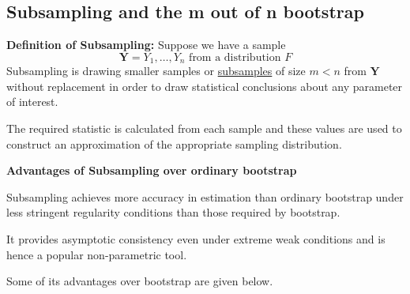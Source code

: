 \documentclass[11pt]{article}
\begin{document}
\subsection{Subsampling and the m out of n bootstrap}
\label{sec-1-5}

\textbf{Definition of Subsampling:} Suppose we have a sample 
$$\mathbf{Y} = Y_1, \ldots, Y_n \mbox{ from a distribution } F$$
Subsampling  is drawing smaller samples or \underline{subsamples} of size $m
<n$ from $\mathbf{Y}$ without replacement in order to draw statistical
conclusions
 about any parameter of interest.

The required statistic is calculated from each sample and these values
are used to 
construct an approximation of the appropriate sampling distribution.


\textbf{Advantages of Subsampling over ordinary bootstrap}

 Subsampling achieves more accuracy in estimation than ordinary
 bootstrap 
under less stringent regularity conditions than those required by
bootstrap.


It provides asymptotic consistency even under extreme weak 
conditions and is hence a popular non-parametric tool.

Some of its  advantages over bootstrap are given below.
\end{document}
